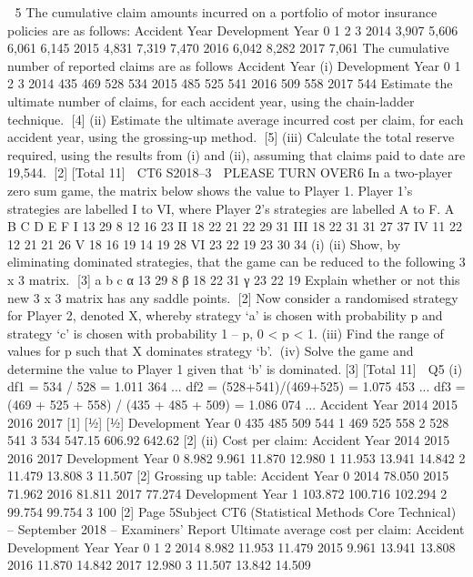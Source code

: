 
5
The cumulative claim amounts incurred on a portfolio of motor insurance policies are
as follows:
Accident Year
Development Year
0 1 2 3
2014 3,907 5,606 6,061 6,145
2015 4,831 7,319 7,470 2016 6,042 8,282 2017 7,061
The cumulative number of reported claims are as follows
Accident Year
(i)
Development Year
0 1 2 3
2014 435 469 528 534
2015 485 525 541 2016 509 558 2017 544
Estimate the ultimate number of claims, for each accident year, using the
chain-ladder technique.
[4]
(ii) Estimate the ultimate average incurred cost per claim, for each accident year,
using the grossing-up method.
[5]
(iii) Calculate the total reserve required, using the results from (i) and (ii),
assuming that claims paid to date are 19,544.
[2]
[Total 11]

CT6 S2018–3 
PLEASE TURN OVER6
In a two-player zero sum game, the matrix below shows the value to Player 1. Player
1’s strategies are labelled I to VI, where Player 2’s strategies are labelled A to F.
A B C D E F
I 13 29 8 12 16 23
II 18 22 21 22 29 31
III 18 22 31 31 27 37
IV 11 22 12 21 21 26
V 18 16 19 14 19 28
VI 23 22 19 23 30 34
(i)
(ii)
Show, by eliminating dominated strategies, that the game can be reduced to the
following 3 x 3 matrix.
[3]
a b c
α 13 29 8
β 18 22 31
γ 23 22 19
Explain whether or not this new 3 x 3 matrix has any saddle points.
[2]
Now consider a randomised strategy for Player 2, denoted X, whereby strategy ‘a’ is
chosen with probability p and strategy ‘c’ is chosen with probability 1 – p, 0 < p < 1.
(iii) Find the range of values for p such that X dominates strategy ‘b’.
(iv) Solve the game and determine the value to Player 1 given that ‘b’ is
dominated.[3]
[Total 11]

Q5
(i)
df1 = 534 / 528 = 1.011 364 ...
df2 = (528+541)/(469+525) = 1.075 453 ...
df3 = (469 + 525 + 558) / (435 + 485 + 509) = 1.086 074 ...
Accident
Year
2014
2015
2016
2017
[1]
[1⁄2]
[1⁄2]
Development Year
0
435
485
509
544
1
469
525
558
2
528
541
3
534
547.15
606.92
642.62
[2]
(ii)
Cost per claim:
Accident
Year
2014
2015
2016
2017
Development Year
0
8.982
9.961
11.870
12.980
1
11.953
13.941
14.842
2
11.479
13.808
3
11.507
[2]
Grossing up table:
Accident
Year
0
2014
78.050%
2015
71.962%
2016
81.811%
2017
77.274%
Development Year
1
103.872%
100.716%
102.294%
2
99.754%
99.754%
3
100%
[2]
Page 5Subject CT6 (Statistical Methods Core Technical) – September 2018 – Examiners’ Report
Ultimate average cost per claim:
Accident
Development Year
Year
0
1
2
2014
8.982
11.953
11.479
2015
9.961
13.941
13.808
2016
11.870
14.842
2017
12.980
3
11.507
13.842
14.509

